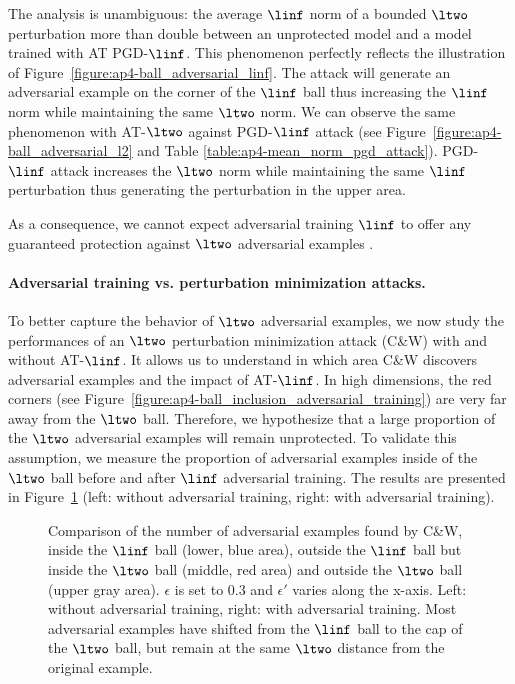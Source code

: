 The analysis is unambiguous: the average $\linf$ norm of a bounded $\ltwo$ perturbation more than double between an unprotected model and a model trained with AT PGD-$\linf$. This phenomenon perfectly reflects the illustration of Figure~\ref{figure:ap4-ball_adversarial_linf}. The attack will generate an adversarial example on the corner of the $\linf$ ball thus increasing the $\linf$ norm while maintaining the same $\ltwo$ norm. 
We can observe the same phenomenon with AT-$\ltwo$ against PGD-$\linf$ attack (see Figure~\ref{figure:ap4-ball_adversarial_l2} and Table \ref{table:ap4-mean_norm_pgd_attack}). PGD-$\linf$ attack increases the $\ltwo$ norm while maintaining the same $\linf$ perturbation thus generating the perturbation in the upper area. 

As a consequence, we cannot expect adversarial training $\linf$ to offer any guaranteed protection against $\ltwo$ adversarial examples .

\paragraph{Adversarial training vs. perturbation minimization attacks.}
To better capture the behavior of $\ltwo$ adversarial examples, we now study the performances of an $\ltwo$ perturbation minimization attack (C\&W) with and without AT-$\linf$.
It allows us to understand in which area C\&W discovers adversarial examples and the impact of AT-$\linf$.
In high dimensions, the red corners (see Figure~\ref{figure:ap4-ball_inclusion_adversarial_training}) are very far away from the $\ltwo$ ball.
Therefore, we hypothesize that a large proportion of the $\ltwo$ adversarial examples will remain unprotected.
To validate this assumption, we measure the proportion of adversarial examples inside of the $\ltwo$ ball before and after $\linf$ adversarial training.
The results are presented in Figure~\ref{fig:calotte} (left: without adversarial training, right: with adversarial training). 

\begin{figure}[htb]
    \centering
    
    \caption{Comparison of the number of adversarial examples found by C\&W, inside the $\linf$ ball (lower, blue area), outside the $\linf$ ball but inside the $\ltwo$ ball (middle, red area) and outside the $\ltwo$ ball (upper gray area). $\epsilon$ is set to $0.3$ and $\epsilon'$ varies along the x-axis. Left: without adversarial training, right: with adversarial training. Most adversarial examples have shifted from the $\linf$ ball to the cap of the $\ltwo$ ball, but remain at the same $\ltwo$ distance from the original example.}
    \label{fig:calotte}
\end{figure}


